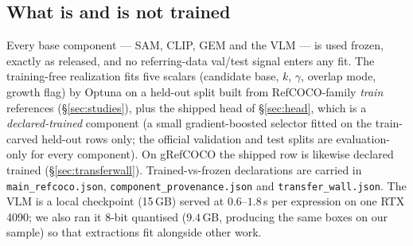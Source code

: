 \subsection{What is and is not trained}
Every base component --- SAM, CLIP, GEM and the VLM --- is used frozen, exactly
as released, and no referring-data val/test signal enters any fit. The
training-free realization fits five scalars (candidate base, $k$, $\gamma$,
overlap mode, growth flag) by Optuna on a held-out split built from
RefCOCO-family \emph{train} references (\S\ref{sec:studies}), plus the shipped
head of \S\ref{sec:head}, which is a \emph{declared-trained} component (a small
gradient-boosted selector fitted on the train-carved held-out rows only; the
official validation and test splits are evaluation-only for every component).
On gRefCOCO the shipped row is likewise declared trained
(\S\ref{sec:transferwall}). Trained-vs-frozen declarations are carried in
\texttt{main\_refcoco.json}, \texttt{component\_provenance.json} and
\texttt{transfer\_wall.json}. The VLM is a local checkpoint
(15\,GB) served at $0.6$--$1.8$\,s per expression on one RTX 4090; we also
ran it 8-bit quantised ($9.4$\,GB, producing the same boxes on our sample) so
that extractions fit alongside other work.
